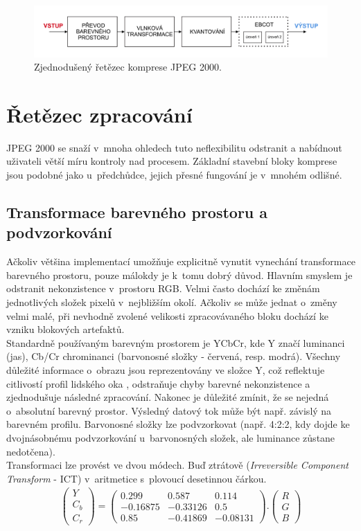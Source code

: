 \begin{figure}[hbt!]
  \hspace*{-0.5cm}
  \includegraphics[width=16cm]{obrazky-figures/Artboard2.pdf}
  \caption{Zjednodušený řetězec komprese JPEG 2000.}
  \label{retezec}
\end{figure}

\section{Řetězec zpracování}
JPEG 2000 se snaží v~mnoha ohledech tuto neflexibilitu odstranit a nabídnout uživateli větší míru kontroly nad procesem. Základní stavební bloky komprese jsou podobné jako u~předchůdce, jejich přesné fungování je v~mnohém odlišné.
\subsection*{Transformace barevného prostoru a podvzorkování}
Ačkoliv většina implementací umožňuje explicitně vynutit vynechání transformace barevného prostoru, pouze málokdy je k~tomu dobrý důvod. Hlavním smyslem je odstranit nekonzistence v~prostoru RGB. Velmi často dochází ke změnám jednotlivých složek pixelů v~nejbližším okolí. Ačkoliv se může jednat o~změny velmi malé, při nevhodně zvolené velikosti zpracovávaného bloku dochází ke vzniku blokových artefaktů.\\
Standardně používaným barevným prostorem je YCbCr, kde Y značí luminanci (jas), Cb/Cr chrominanci (barvonosné složky - červená, resp. modrá). Všechny důležité informace o~obrazu jsou reprezentovány ve složce Y, což reflektuje citlivostí profil lidského oka \cite{oko}, odstraňuje chyby barevné nekonzistence a zjednodušuje následné zpracování. Nakonec je důležité zmínit, že se nejedná o~absolutní barevný prostor. Výsledný datový tok může být např. závislý na barevném profilu. Barvonosné složky lze podvzorkovat (např. 4:2:2, kdy dojde ke dvojnásobnému podvzorkování u~barvonosných složek, ale luminance zůstane nedotčena).\\
Transformaci lze provést ve dvou módech. Buď ztrátově (\textit{Irreversible Component Transform} - ICT) v~aritmetice s~plovoucí desetinnou čárkou.
\begin{gather}
 \begin{pmatrix} Y \\ C_b \\ C_r \end{pmatrix}
 =
 \begin{pmatrix} 0.299 & 0.587 & 0.114 \\ -0.16875 & - 0.33126 & 0.5 \\ 0.85 & - 0.41869 & -0.08131 \end{pmatrix}
.
 \begin{pmatrix} R \\ G \\ B \end{pmatrix}
\end{gather}

